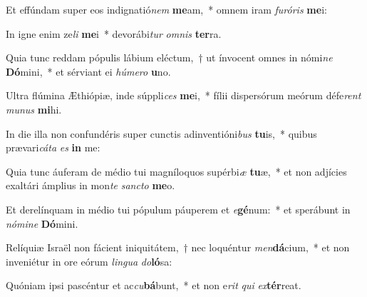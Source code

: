 \item Et effúndam super eos indignatió\textit{nem} \textbf{me}am,~* omnem iram \textit{fu}\textit{ró}\textit{ris} \textbf{me}i:
\item In igne enim ze\textit{li} \textbf{me}i~* devorábi\textit{tur} \textit{om}\textit{nis} \textbf{ter}ra.
\item Quia tunc reddam pópulis lábium eléctum,~† ut ínvocent omnes in nómi\textit{ne} \textbf{Dó}mini,~* et sérviant ei \textit{hú}\textit{me}\textit{ro} \textbf{u}no.
\item Ultra flúmina Æthiópiæ, inde súppli\textit{ces} \textbf{me}i,~* fílii dispersórum meórum défe\textit{rent} \textit{mu}\textit{nus} \textbf{mi}hi.
\item In die illa non confundéris super cunctis adinventióni\textit{bus} \textbf{tu}is,~* quibus prævari\textit{cá}\textit{ta} \textit{es} \textbf{in} me:
\item Quia tunc áuferam de médio tui magníloquos supérbi\textit{æ} \textbf{tu}æ,~* et non adjícies exaltári ámplius in mon\textit{te} \textit{sanc}\textit{to} \textbf{me}o.
\item Et derelínquam in médio tui pópulum páuperem et \textit{e}\textbf{gé}num:~* et sperábunt in \textit{nó}\textit{mi}\textit{ne} \textbf{Dó}mini.
\item Relíquiæ Israël non fácient iniquitátem,~† nec loquéntur \textit{men}\textbf{dá}cium,~* et non inveniétur in ore eórum \textit{lin}\textit{gua} \textit{do}\textbf{ló}sa:
\item Quóniam ipsi pascéntur et ac\textit{cu}\textbf{bá}bunt,~* et non e\textit{rit} \textit{qui} \textit{ex}\textbf{tér}reat.
